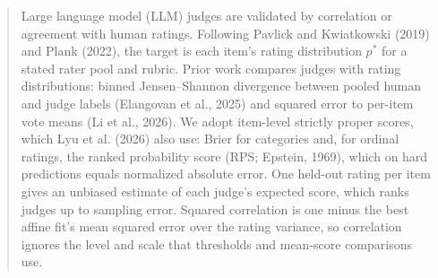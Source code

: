 \begin{abstract}
\noindent
Large language model (LLM) judges are validated by correlation or agreement with human ratings.
Following Pavlick and Kwiatkowski (2019) and Plank (2022), the target is each item's rating distribution $p^*$ for a stated rater pool and rubric.
Prior work compares judges with rating distributions: binned Jensen--Shannon divergence between pooled human and judge labels (Elangovan et al., 2025) and squared error to per-item vote means (Li et al., 2026).
We adopt item-level strictly proper scores, which Lyu et al. (2026) also use: Brier for categories and, for ordinal ratings, the ranked probability score (RPS; Epstein, 1969), which on hard predictions equals normalized absolute error.
One held-out rating per item gives an unbiased estimate of each judge's expected score, which ranks judges up to sampling error.
Squared correlation is one minus the best affine fit's mean squared error over the rating variance, so correlation ignores the level and scale that thresholds and mean-score comparisons use.

\end{abstract}
